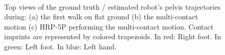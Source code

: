 \documentclass{IJCAS}
\begin{document}
\begin{figure}[]
    \centering
    \hfill
    \\[-1ex]
    \caption{Top views of the ground truth / estimated robot's pelvis trajectories during: (a) the first walk on flat ground (b) the multi-contact motion (c) HRP-5P performing the multi-contact motion. Contact imprints are represented by colored trapezoids. In red: Right foot. In green: Left foot. In blue: Left hand.  }
    \label{fig:flat-odom-rphs1}
\end{figure}
\end{document}
